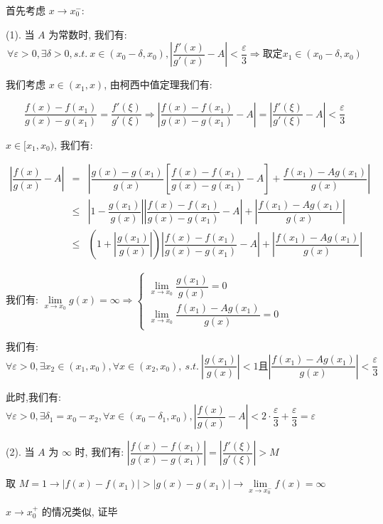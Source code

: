 \begin{anymark}[证明]
	首先考虑 $x\to x_{0}^{-}$:

	(1). 当 $A$ 为常数时, 我们有:
	$$\forall \varepsilon > 0, \exists \delta > 0, s.t.\ x\in (x_{0}-\delta,x_{0}), |\dfrac{f'(x)}{g'(x)}-A|<\dfrac{\varepsilon}{3}\Rightarrow \text{取定} x_{1}\in (x_{0}-\delta,x_{0})$$

	我们考虑 $x\in (x_{1},x)$, 由柯西中值定理我们有:

	$$\dfrac{f(x)-f(x_{1})}{g(x)-g(x_{1})} = \dfrac{f'(\xi)}{g'(\xi)}\Rightarrow |\dfrac{f(x)-f(x_{1})}{g(x)-g(x_{1})}-A| = |\dfrac{f'(\xi)}{g'(\xi)}-A| < \dfrac{\varepsilon}{3}$$

	$x\in[x_{1},x_{0})$, 我们有:

	\begin{eqnarray*}
		|\dfrac{f(x)}{g(x)} -A| &=& |\dfrac{g(x)-g(x_{1})}{g(x)} \left[\dfrac{f(x)-f(x_{1})}{g(x)-g(x_{1})}-A\right] + \dfrac{f(x_{1})-Ag(x_{1})}{g(x)}|\\
								&\leq& |1-\dfrac{g(x_{1})}{g(x)}||\dfrac{f(x)-f(x_{1})}{g(x)-g(x_{1})}-A|+|\dfrac{f(x_{1})-Ag(x_{1})}{g(x)}|\\
								&\leq& (1+|\dfrac{g(x_{1})}{g(x)}|)|\dfrac{f(x)-f(x_{1})}{g(x)-g(x_{1})}-A|+|\dfrac{f(x_{1})-Ag(x_{1})}{g(x)}|
	\end{eqnarray*}

	我们有: $\lim\limits_{x\to x_{0}}g(x) =\infty\Rightarrow \begin{cases} \lim\limits_{x\to x_{0}}\dfrac{g(x_{1})}{g(x)} =0 \\ \lim\limits_{x\to x_{0}}\dfrac{f(x_{1})-Ag(x_{1})}{g(x)}=0\end{cases}$

	我们有:
	$$\forall \varepsilon >0, \exists x_{2}\in(x_{1},x_{0}),\forall x\in(x_{2},x_{0}),\ s.t.\ |\dfrac{g(x_{1})}{g(x)}|< 1 \text{且} |\dfrac{f(x_{1})-Ag(x_{1})}{g(x)}|< \dfrac{\varepsilon}{3}$$

	此时,我们有: $\forall \varepsilon > 0, \exists \delta_{1} = x_{0}-x_{2}, \forall x\in (x_{0}-\delta_{1},x_{0}), |\dfrac{f(x)}{g(x)} -A|<2\cdot \dfrac{\varepsilon}{3}+\dfrac{\varepsilon}{3}=\varepsilon$
	
	(2). 当 $A$ 为 $\infty$ 时, 我们有: $|\dfrac{f(x)-f(x_{1})}{g(x)-g(x_{1})}| = |\dfrac{f'(\xi)}{g'(\xi)}| > M$
	
	取 $M = 1\to |f(x)-f(x_{1})|>|g(x)-g(x_{1})|\to \lim\limits_{x\to x_{0}^{-}}f(x) = \infty$

	$x\to x_{0}^{+}$ 的情况类似, 证毕
\end{anymark}


